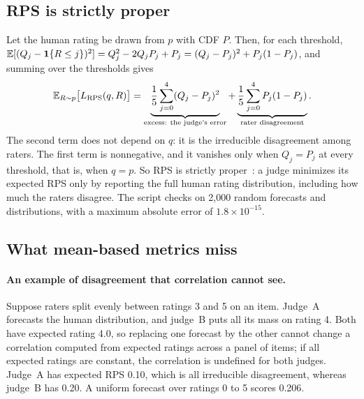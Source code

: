 \subsection{RPS is strictly proper}
\label{app:rps-proper}

Let the human rating be drawn from $p$ with CDF $P$.
Then, for each threshold, $\mathbb{E}[(Q_j-\mathbf{1}\{R\le j\})^2]=Q_j^2-2Q_jP_j+P_j=(Q_j-P_j)^2+P_j(1-P_j)$, and summing over the thresholds gives
\begin{equation}
\mathbb{E}_{R\sim p}\bigl[L_{\mathrm{RPS}}(q,R)\bigr]=\underbrace{\frac15\sum_{j=0}^{4}(Q_j-P_j)^2}_{\text{excess: the judge's error}}+\underbrace{\frac15\sum_{j=0}^{4}P_j(1-P_j)}_{\text{rater disagreement}} .
\label{eq:rps-decomposition}
\end{equation}
The second term does not depend on $q$: it is the irreducible disagreement among raters.
The first term is nonnegative, and it vanishes only when $Q_j=P_j$ at every threshold, that is, when $q=p$.
So RPS is strictly proper~\citep{gneiting2007strictly}: a judge minimizes its expected RPS only by reporting the full human rating distribution, including how much the raters disagree.
The script checks  on 2{,}000 random forecasts and distributions, with a maximum absolute error of $1.8\times10^{-15}$.

\subsection{What mean-based metrics miss}
\label{app:rps-mean}

\paragraph{An example of disagreement that correlation cannot see.}
Suppose raters split evenly between ratings 3 and 5 on an item.
Judge~A forecasts the human distribution, and judge~B puts all its mass on rating 4.
Both have expected rating 4.0, so replacing one forecast by the other cannot change a correlation computed from expected ratings across a panel of items; if all expected ratings are constant, the correlation is undefined for both judges.
Judge~A has expected RPS 0.10, which is all irreducible disagreement, whereas judge~B has 0.20.
A uniform forecast over ratings 0 to 5 scores 0.206.

